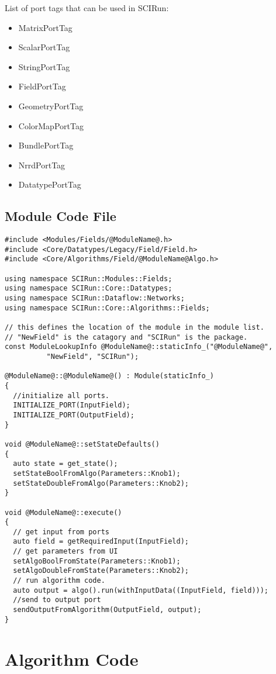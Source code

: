 \documentclass[fleqn,11pt,openany]{book}
\begin{document}
List of port tags that can be used in SCIRun:
\begin{itemize}
\item MatrixPortTag 
\item ScalarPortTag
\item StringPortTag
\item FieldPortTag
\item GeometryPortTag
\item ColorMapPortTag
\item BundlePortTag
\item NrrdPortTag
\item DatatypePortTag
\end{itemize}

\subsection{Module Code File}

\begin{verbatim}
#include <Modules/Fields/@ModuleName@.h>
#include <Core/Datatypes/Legacy/Field/Field.h>
#include <Core/Algorithms/Field/@ModuleName@Algo.h>

using namespace SCIRun::Modules::Fields;
using namespace SCIRun::Core::Datatypes;
using namespace SCIRun::Dataflow::Networks;
using namespace SCIRun::Core::Algorithms::Fields;

// this defines the location of the module in the module list.  
// "NewField" is the catagory and "SCIRun" is the package.
const ModuleLookupInfo @ModuleName@::staticInfo_("@ModuleName@", 
          "NewField", "SCIRun");

@ModuleName@::@ModuleName@() : Module(staticInfo_)
{
  //initialize all ports.
  INITIALIZE_PORT(InputField);
  INITIALIZE_PORT(OutputField);
}

void @ModuleName@::setStateDefaults()
{
  auto state = get_state();
  setStateBoolFromAlgo(Parameters::Knob1);
  setStateDoubleFromAlgo(Parameters::Knob2);
}

void @ModuleName@::execute()
{
  // get input from ports
  auto field = getRequiredInput(InputField);
  // get parameters from UI
  setAlgoBoolFromState(Parameters::Knob1);
  setAlgoDoubleFromState(Parameters::Knob2);
  // run algorithm code.  
  auto output = algo().run(withInputData((InputField, field)));
  //send to output port
  sendOutputFromAlgorithm(OutputField, output);
}
\end{verbatim}


\section{Algorithm Code}
\label{sec:algo}
\end{document}
